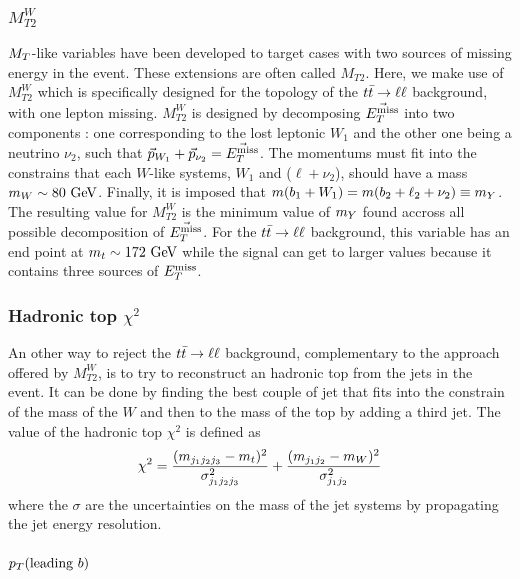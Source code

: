         \subsubsection{$M_{T2}^{W}$}
        
        $M_T$-like variables have been developed to target cases with two sources of missing energy
        in the event.  These extensions are often called $M_{T2}$. Here, we make use of
        $M_{T2}^W$ which is specifically designed for the topology of the $t\bar{t} \rightarrow \ell \ell$ background, with
        one lepton missing. $M_{T2}^W$ is designed by decomposing $\vec{E_T^\text{miss}}$ into two
        components : one corresponding to the lost leptonic $W_1$ and the other one being
        a neutrino $\nu_2$, such that $\vec{p}_{W_1} + \vec{p}_{\nu_2} = \vec{E_T^\text{miss}}$.
        The momentums must fit into the constrains that each $W$-like systems, $W_1$ and 
        ($\ell + \nu_2$), should have a mass $m_W \sim 80 ~\text{GeV}$. Finally, it is imposed that
        $m(b_1 + W_1) = m(b_2 + \ell_2 + \nu_2) \equiv m_{Y}$. 
        The resulting value for $M_{T2}^W$ is the minimum value of $m_{Y}$ found accross
        all possible decomposition of $\vec{E_T^\text{miss}}$. For the $t\bar{t} \rightarrow \ell \ell$ background, 
        this variable has an end point at $m_t \sim 172~\text{GeV}$ while the signal can get to 
        larger values because it contains three sources of $E_T^\text{miss}$.


        \subsubsection{Hadronic top $\chi^{2}$}
        
        An other way to reject the $t\bar{t} \rightarrow \ell \ell$ background, complementary to the approach
        offered by $M_{T2}^{W}$, is to try to reconstruct an hadronic top from the jets 
        in the event. It can be done by finding the best couple of jet that fits into
        the constrain of the mass of the $W$ and then to the mass of the top by adding a 
        third jet. The value of the hadronic top $\chi^2$ is defined as 
        $$\chi^2 = \frac{(m_{j_1 j_2 j_3} - m_{t})^2}{\sigma^2_{j_1 j_2 j_3}} + \frac{(m_{j_1 j_2} - m_{W})^2}{\sigma^2_{j_1 j_2}}$$
        where the $\sigma$ are the uncertainties on the mass of the jet systems by 
        propagating the jet energy resolution.

        \subsubsection{$p_T(\text{leading } b)$}


